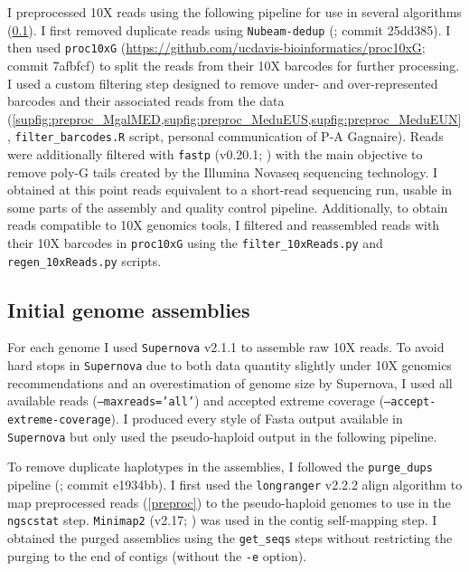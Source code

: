 \documentclass[11pt, a4paper]{article}
\begin{document}
I preprocessed 10X reads using the following pipeline for use in several algorithms (\cref{draft_asm}).
I first removed duplicate reads using \texttt{Nubeam-dedup} (\cite{Dai2020}; commit 25dd385).
I then used \texttt{proc10xG} (\url{https://github.com/ucdavis-bioinformatics/proc10xG}; commit 7afbfcf) to split the reads from their 10X barcodes for further processing.
I used a custom filtering step designed to remove under- and over-repre\-sented barcodes and their associated reads from the data (\cref{supfig:preproc_MgalMED,supfig:preproc_MeduEUS,supfig:preproc_MeduEUN}, \texttt{filter\_barcodes.R} script, personal communication of P-A Gagnaire).
Reads were additionally filtered with \texttt{fastp} (v0.20.1; \cite{Chen2018}) with the main objective to remove poly-G tails created by the Illumina Novaseq sequencing technology.
I obtained at this point reads equivalent to a short-read sequencing run, usable in some parts of the assembly and quality control pipeline.
Additionally, to obtain reads compatible to 10X genomics tools, I filtered and reassembled reads with their 10X barcodes in \texttt{proc10xG} using the \texttt{filter\_10xReads.py} and \texttt{regen\_10xReads.py} scripts.

\subsection{Initial genome assemblies}\label{draft_asm}

For each genome I used \texttt{Supernova} v2.1.1 \parencite{Weisenfeld2017} to assemble raw 10X reads.
To avoid hard stops in \texttt{Supernova} due to both data quantity slightly under 10X genomics recommendations and an overestimation of genome size by Supernova, I used all available reads (\texttt{--maxreads='all'}) and accepted extreme coverage (\texttt{--accept-extreme-coverage}).
I produced every style of Fasta output available in \texttt{Supernova} but only used the pseudo-haploid output in the following pipeline.

To remove duplicate haplotypes in the assemblies, I followed the \texttt{purge\_dups} pipeline (\cite{Guan2020}; commit e1934bb).
I first used the \texttt{longranger} v2.2.2 align algorithm to map preprocessed reads (\cref{preproc}) to the pseudo-haploid genomes to use in the \texttt{ngscstat} step.
\texttt{Minimap2} (v2.17; \cite{Li2017}) was used in the contig self-mapping step.
I obtained the purged assemblies using the \texttt{get\_seqs} steps without restricting the purging to the end of contigs (without the \texttt{-e} option).
\end{document}
